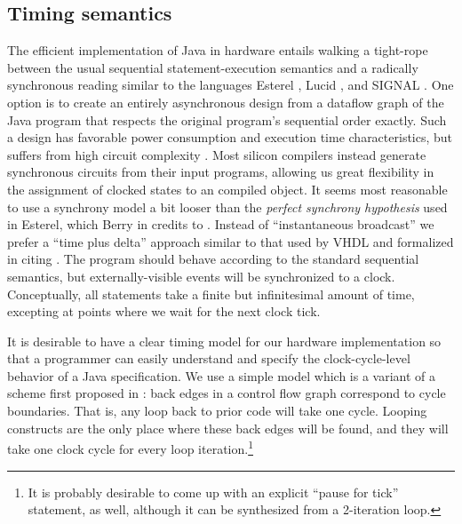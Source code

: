 \documentclass[11pt,notitlepage,twocolumn]{article}
\begin{document}
\subsection{Timing semantics}
The efficient implementation of Java in hardware entails walking a
tight-rope between the usual sequential statement-execution semantics
and a radically synchronous reading similar to the languages Esterel
\cite{berry:esterel_primer}, Lucid \cite{missing_reference}, and
SIGNAL \cite{amagbegnon95:signal}.  One option is to create an
entirely asynchronous design \cite{emerson97:async_design}
from a dataflow graph of the Java program
that respects the original program's sequential order exactly.  Such a
design has favorable power consumption and execution time
characteristics, but suffers from high circuit complexity
\cite{cheng97:diclasp, nanda97:universal}.
Most silicon compilers instead generate synchronous circuits from
their input programs, allowing us great flexibility in the assignment
of clocked states to an compiled object.  It seems most reasonable to
use a synchrony model a bit looser than the \textit{perfect synchrony
hypothesis} used in Esterel, which Berry in
\cite{berry92:hardware_esterel} credits to \cite{benveniste91:synchrony}.
Instead of ``instantaneous broadcast'' we prefer a ``time plus delta''
approach similar to that used by VHDL 
\cite{one_of_the_books_i_used_for_the_silicon_c_paper} and formalized
in \cite{gagne97:nonstandard} citing \cite{gagne96:nonstandard}.  The
program should behave according to the standard sequential semantics,
but externally-visible events will be synchronized to a clock.
Conceptually, all statements take a finite but infinitesimal amount of
time, excepting at points where we wait for the next clock tick.

It is desirable to have a clear timing model for our hardware
implementation so that a programmer can easily understand and specify
the clock-cycle-level behavior of a Java specification.  We use a
simple model which is a variant of a scheme first proposed in
\cite{galloway95:transmogrifier}:  back edges in a control flow graph
correspond to cycle boundaries.  That is, any loop back to prior code
will take one cycle.  Looping constructs are the only place where
these back edges will be found, and they will take one clock cycle for
every loop iteration.\footnote{It is probably desirable to come up
with an explicit ``pause for tick'' statement, as well, although it
can be synthesized from a 2-iteration loop.}
\end{document}

